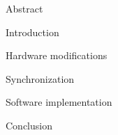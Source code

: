 




\usepackage{antropy_en}


  

  \begin{topchapter}{Abstract}
    
  \end{topchapter}

  \begin{topchapter}{Introduction}
    
  \end{topchapter}

  \begin{topchapter}{Hardware modifications}
    
  \end{topchapter}

  \begin{topchapter}{Synchronization}
    
  \end{topchapter}

  \begin{topchapter}{Software implementation}
    
  \end{topchapter}

  \begin{topchapter}{Conclusion}
    
  \end{topchapter}

  \newpage
  \printglossaries

  \newpage
  \printbibliography

